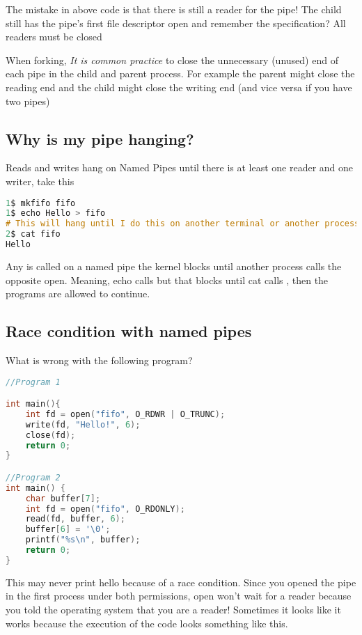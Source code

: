 The mistake in above code is that there is still a reader for the pipe! The child still has the pipe's first file descriptor open and remember the specification? All readers must be closed 

When forking, \emph{It is common practice} to close the unnecessary (unused) end of each pipe in the child and parent process. For example the parent might close the reading end and the child might close the writing end (and vice versa if you have two pipes)

\subsection{Why is my pipe hanging?}\label{why-is-my-pipe-hanging}

Reads and writes hang on Named Pipes until there is at least one reader and one writer, take this

\begin{lstlisting}[language=C]
1$ mkfifo fifo
1$ echo Hello > fifo
# This will hang until I do this on another terminal or another process
2$ cat fifo
Hello
\end{lstlisting}

Any  is called on a named pipe the kernel blocks until another process calls the opposite open. Meaning, echo calls  but that blocks until cat calls , then the programs are allowed to continue.

\subsection{Race condition with named pipes}

What is wrong with the following program?

\begin{lstlisting}[language=C]
//Program 1

int main(){
    int fd = open("fifo", O_RDWR | O_TRUNC);
    write(fd, "Hello!", 6);
    close(fd);
    return 0;
}

//Program 2
int main() {
    char buffer[7];
    int fd = open("fifo", O_RDONLY);
    read(fd, buffer, 6);
    buffer[6] = '\0';
    printf("%s\n", buffer);
    return 0;
}
\end{lstlisting}

This may never print hello because of a race condition. Since you opened the pipe in the first process under both permissions, open won't wait for a reader because you told the operating system that you are a reader! Sometimes it looks like it works because the execution of the code looks something like this.

